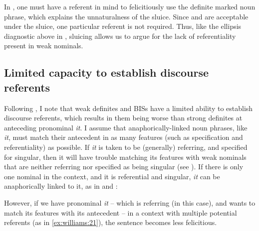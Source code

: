 \documentclass[output=paper,
modfonts
]{langscibook}
\begin{document}
In , one must have a referent in mind to felicitiously use the definite marked noun phrase, which explains the unnaturalness of the sluice. Since  and  are acceptable under the sluice, one particular referent is not required. Thus, like the ellipsis diagnostic above in , sluicing allows us to argue for the lack of referentiality present in weak nominals. 


\subsection{Limited capacity to establish discourse referents}\label{sec:williams:2.4} 

Following \citet[182]{Aguilar-GuevaraZwarsts2011}, I note that weak definites and BISs have a limited ability to establish discourse referents, which results in them being  worse than strong definites at anteceding pronominal \textit{it}. I assume that anaphorically-linked noun phrases, like \textit{it}, must match their antecedent in as many features (such as  specification and referentiality) as possible. If \textit{it} is taken to be (generally) referring, and specified for singular, then it will have trouble matching its features with weak nominals that are neither referring nor specified as being singular (see ). If there is only one nominal in the context, and it is referential and singular, \textit{it} can be anaphorically linked to it, as in  and :

\begin{exe} 
\end{exe}

However, if we have pronominal \textit{it} -- which is referring (in this case), and wants to match its  features with its antecedent -- in a context with multiple potential referents (as in \ref{ex:williams:21}), the sentence becomes less felicitious.

\begin{exe}
\end{exe}    
\end{document}
